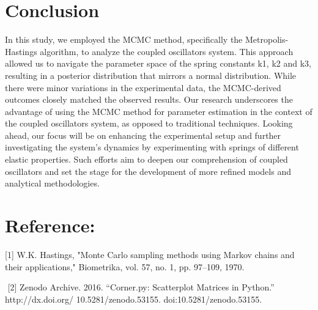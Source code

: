 \documentclass[12pt, a4paper]{article}%
\begin{document}
\section{Conclusion}
In this study, we employed the MCMC method, specifically the Metropolis-Hastings algorithm, to analyze the coupled oscillators system. This approach allowed us to navigate the parameter space of the spring constants k1, k2 and k3, resulting in a posterior distribution that mirrors a normal distribution. 
While there were minor variations in the experimental data, the MCMC-derived outcomes closely matched the observed results. Our research underscores the advantage of using the MCMC method for parameter estimation in the context of the coupled oscillators system, as opposed to traditional techniques.
Looking ahead, our focus will be on enhancing the experimental setup and further investigating the system's dynamics by experimenting with springs of different elastic properties. Such efforts aim to deepen our comprehension of coupled oscillators and set the stage for the development of more refined models and analytical methodologies.


\section{Reference:}


[1] W.K. Hastings, "Monte Carlo sampling methods using Markov chains and their applications," Biometrika, vol. 57, no. 1, pp. 97–109, 1970.

 [2] Zenodo Archive. 2016. “Corner.py: Scatterplot Matrices in Python.” http://dx.doi.org/ 10.5281/zenodo.53155. doi:10.5281/zenodo.53155.
\end{document}

